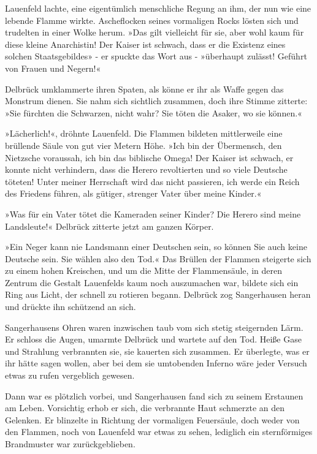Lauenfeld lachte, eine eigentümlich menschliche Regung an ihm, der
nun wie eine lebende Flamme wirkte. Ascheflocken seines vormaligen
Rocks lösten sich und trudelten in einer Wolke herum. »Das gilt
vielleicht für sie, aber wohl kaum für diese kleine Anarchistin!
Der Kaiser ist schwach, dass er die Existenz eines solchen
Staatsgebildes» - er spuckte das Wort aus - »überhaupt zulässt!
Geführt von Frauen und Negern!«

Delbrück umklammerte ihren Spaten, als könne er ihr als Waffe gegen
das Monstrum dienen. Sie nahm sich sichtlich zusammen, doch ihre
Stimme zitterte: »Sie fürchten die Schwarzen, nicht wahr? Sie töten
die Asaker, wo sie können.«

»Lächerlich!«, dröhnte Lauenfeld. Die Flammen bildeten mittlerweile
eine brüllende Säule von gut vier Metern Höhe. »Ich bin der
Übermensch, den Nietzsche voraussah, ich bin das biblische Omega!
Der Kaiser ist schwach, er konnte nicht verhindern, dass die Herero
revoltierten und so viele Deutsche töteten! Unter meiner Herrschaft
wird das nicht passieren, ich werde ein Reich des Friedens führen,
als gütiger, strenger Vater über meine Kinder.«

»Was für ein Vater tötet die Kameraden seiner Kinder? Die Herero
sind meine Landsleute!« Delbrück zitterte jetzt am ganzen Körper.

»Ein Neger kann nie Landsmann einer Deutschen sein, so können Sie
auch keine Deutsche sein. Sie wählen also den Tod.« Das Brüllen der
Flammen steigerte sich zu einem hohen Kreischen, und um die Mitte
der Flammensäule, in deren Zentrum die Gestalt Lauenfelds kaum noch
auszumachen war, bildete sich ein Ring aus Licht, der schnell zu
rotieren begann. Delbrück zog Sangerhausen heran und drückte ihn
schützend an sich.

Sangerhausens Ohren waren inzwischen taub vom sich stetig
steigernden Lärm. Er schloss die Augen, umarmte Delbrück und
wartete auf den Tod. Heiße Gase und Strahlung verbrannten sie, sie
kauerten sich zusammen. Er überlegte, was er ihr hätte sagen
wollen, aber bei dem sie umtobenden Inferno wäre jeder Versuch
etwas zu rufen vergeblich gewesen.

\bigpar

Dann war es plötzlich vorbei, und Sangerhausen fand sich zu seinem
Erstaunen am Leben. Vorsichtig erhob er sich, die verbrannte Haut
schmerzte an den Gelenken. Er blinzelte in Richtung der vormaligen
Feuersäule, doch weder von den Flammen, noch von Lauenfeld war
etwas zu sehen, lediglich ein sternförmiges Brandmuster war
zurückgeblieben.

